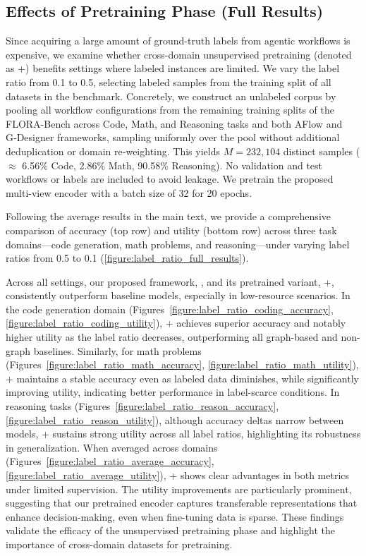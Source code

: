\subsection{Effects of Pretraining Phase (Full Results)} \label{section:full_pretrain}
Since acquiring a large amount of ground-truth labels from agentic workflows is expensive, we examine whether cross-domain unsupervised pretraining (denoted as \ours{}+) benefits settings where labeled instances are limited. We vary the label ratio from 0.1 to 0.5, selecting labeled samples from the training split of all datasets in the benchmark. Concretely, we construct an unlabeled corpus by pooling all workflow configurations from the remaining training splits of the FLORA-Bench across Code, Math, and Reasoning tasks and both AFlow and G‑Designer frameworks, sampling uniformly over the pool without additional deduplication or domain re‑weighting. This yields $M = 232,104$ distinct samples ($\approx$ 6.56\% Code, 2.86\% Math, 90.58\% Reasoning). No validation and test workflows or labels are included to avoid leakage. We pretrain the proposed multi-view encoder with a batch size of 32 for 20 epochs. 

Following the average results in the main text, we provide a comprehensive comparison of accuracy (top row) and utility (bottom row) across three task domains---code generation, math problems, and reasoning---under varying label ratios from 0.5 to 0.1 (\autoref{figure:label_ratio_full_results}).

Across all settings, our proposed framework, \ours{}, and its pretrained variant, \ours{}+, consistently outperform baseline models, especially in low-resource scenarios. In the code generation domain (Figures~\ref{figure:label_ratio_coding_accuracy}, \ref{figure:label_ratio_coding_utility}), \ours{}+ achieves superior accuracy and notably higher utility as the label ratio decreases, outperforming all graph-based and non-graph baselines. Similarly, for math problems (Figures~\ref{figure:label_ratio_math_accuracy}, \ref{figure:label_ratio_math_utility}), \ours{}+ maintains a stable accuracy even as labeled data diminishes, while significantly improving utility, indicating better performance in label-scarce conditions. In reasoning tasks (Figures~\ref{figure:label_ratio_reason_accuracy}, \ref{figure:label_ratio_reason_utility}), although accuracy deltas narrow between models, \ours{}+ sustains strong utility across all label ratios, highlighting its robustness in generalization. When averaged across domains (Figures~\ref{figure:label_ratio_average_accuracy}, \ref{figure:label_ratio_average_utility}), \ours{}+ shows clear advantages in both metrics under limited supervision. The utility improvements are particularly prominent, suggesting that our pretrained encoder captures transferable representations that enhance decision-making, even when fine-tuning data is sparse. These findings validate the efficacy of the unsupervised pretraining phase and highlight the importance of cross-domain datasets for pretraining.


